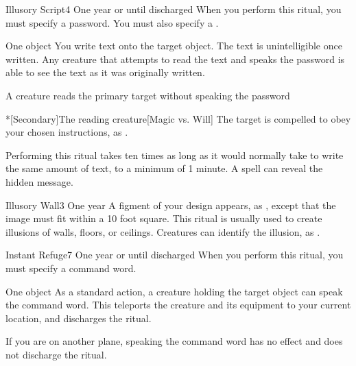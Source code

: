 \begin{spellsection}{Illusory Script}{4}
\spelldur One year or until discharged \dismissable
\spellspecial When you perform this ritual, you must specify a password. You must also specify a .
\begin{spelltarget}[Primary]{One object}
    \spelleffect You write text onto the target object. The text is unintelligible once written. Any creature that attempts to read the text and speaks the password is able to see the text as it was originally written.
\end{spelltarget}
\begin{spelltrigger}{A creature reads the primary target without speaking the password}
    \begin{spelltarget}*[Secondary]{The reading creature}[Magic vs. Will]
        \spellsuccess The target is compelled to obey your chosen instructions, as .
    \end{spelltarget}
\end{spelltrigger}
\spellnotes Performing this ritual takes ten times as long as it would normally take to write the same amount of text, to a minimum of 1 minute. A  spell can reveal the hidden message.
\end{spellsection}

\begin{spellsection}{Illusory Wall}{3}
\spellrng{\rngclose}
\spelldur One year
\spellline
\spelleffect A figment of your design appears, as , except that the image must fit within a 10 foot square.
\spellnotes This ritual is usually used to create illusions of walls, floors, or ceilings. Creatures can identify the illusion, as .
\end{spellsection}

\begin{spellsection}{Instant Refuge}{7}
\spelldur One year or until discharged
\spellspecial When you perform this ritual, you must specify a command word.
\begin{spelltarget}{One object}
    \spelleffect As a standard action, a creature holding the target object can speak the command word. This teleports the creature and its equipment to your current location, and discharges the ritual.
\end{spelltarget}
\spellnotes If you are on another plane, speaking the command word has no effect and does not discharge the ritual.
\end{spellsection}

